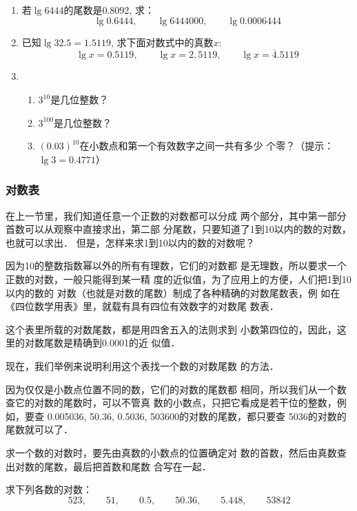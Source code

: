 \begin{ex}
\begin{enumerate}
\item 若$\lg6444$的尾数是0.8092, 求：
\[\lg0.6444,\qquad \lg6444000,\qquad \lg0.0006444\]
\item 已知$\lg32.5=1.5119$, 求下面对数式中的真数$x$:
\[\lg x=0.5119,\qquad \lg x=2,5119,\qquad \lg x=\bar{4}.5119\]
\item \begin{enumerate}
\item $3^{10}$是几位整数？
\item $3^{100}$是几位整数？
\item $(0.03)^{10}$在小数点和第一个有效数字之间一共有多少
个零？（提示：$\lg3=0.4771$）
\end{enumerate}
\end{enumerate}
\end{ex}

\subsubsection{对数表}
在上一节里，我们知道任意一个正数的对数都可以分成
两个部分，其中第一部分首数可以从观察中直接求出，第二部
分尾数，只要知道了1到10以内的数的对数，也就可以求出．
但是，怎样来求1到10以内的数的对数呢？

因为10的整数指数幂以外的所有有理数，它们的对数都
是无理数，所以要求一个正数的对数，一般只能得到某一精
度的近似值，为了应用上的方便，人们把1到10以内的数的
对数（也就是对数的尾数）制成了各种精确的对数尾数表，例
如在《四位数学用表》里，就载有具有四位有效数字的对数尾
数表．

这个表里所载的对数尾数，都是用四舍五入的法则求到
小数第四位的，因此，这里的对数尾数是精确到0.0001的近
似值．

现在，我们举例来说明利用这个表找一个数的对数尾数
的方法．

因为仅仅是小数点位置不同的数，它们的对数的尾数都
相同，所以我们从一个数查它的对数的尾数时，可以不管真
数的小数点，只把它看成是若干位的整数，例如，要查
0.005036, 50.36, 0.5036, 503600的对数的尾数，都只要查
5036的对数的尾数就可以了．

求一个数的对数时，要先由真数的小数点的位置确定对
数的首数，然后由真数查出对数的尾数，最后把首数和尾数
合写在一起．

\begin{example}
    求下列各数的对数：
\[523,\qquad 51,\qquad 0.5,\qquad 50.36,\qquad 5.448,\qquad 53842\]
\end{example}

